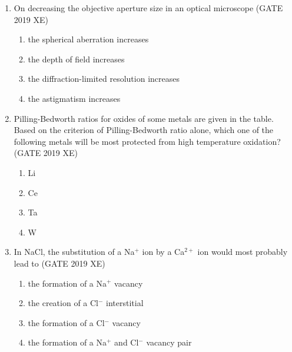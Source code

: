 \documentclass[journal,12pt,onecolumn]{IEEEtran}
\begin{document}
\begin{enumerate}

\item On decreasing the objective aperture size in an optical microscope
\hfill{(GATE 2019 XE)} \\
\begin{multicols}{2}
\begin{enumerate}
\item the spherical aberration increases
\item the depth of field increases
\item the diffraction-limited resolution increases
\item the astigmatism increases
\end{enumerate}
\end{multicols}

\item Pilling-Bedworth ratios for oxides of some metals are given in the table.\\



Based on the criterion of Pilling-Bedworth ratio alone, which one of the following metals will be most protected from high temperature oxidation?
\hfill{(GATE 2019 XE)} \\
\begin{multicols}{2}
\begin{enumerate}
\item Li
\item Ce
\item Ta
\item W
\end{enumerate}
\end{multicols}

\item In NaCl, the substitution of a Na$^+$ ion by a Ca$^{2+}$ ion would most probably lead to
\hfill{(GATE 2019 XE)} \\
\begin{multicols}{2}
\begin{enumerate}
\item the formation of a Na$^+$ vacancy
\item the creation of a Cl$^-$ interstitial
\item the formation of a Cl$^-$ vacancy
\item the formation of a Na$^+$ and Cl$^-$ vacancy pair
\end{enumerate}
\end{multicols}


\end{enumerate}
\end{document}
